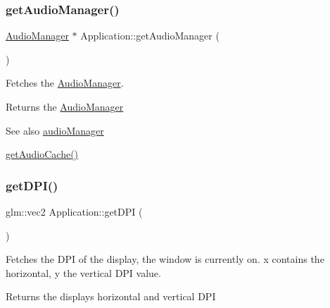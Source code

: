 \subsubsection{\texorpdfstring{getAudioManager()}{getAudioManager()}}
{\footnotesize\ttfamily \mbox{\hyperlink{classsage_1_1AudioManager}{Audio\+Manager}} $\ast$ Application\+::get\+Audio\+Manager (\begin{DoxyParamCaption}{ }\end{DoxyParamCaption})}



Fetches the \mbox{\hyperlink{classsage_1_1AudioManager}{Audio\+Manager}}. 

\begin{DoxyReturn}{Returns}
the \mbox{\hyperlink{classsage_1_1AudioManager}{Audio\+Manager}} 
\end{DoxyReturn}
\begin{DoxySeeAlso}{See also}
\mbox{\hyperlink{classsage_1_1Application_aa5d509f796f7d2d9a779fc01143c3a75}{audio\+Manager}} 

\mbox{\hyperlink{classsage_1_1Application_aaed4c540666d784b83d5506e51fb5eaa}{get\+Audio\+Cache()}} 
\end{DoxySeeAlso}
\mbox{\label{classsage_1_1Application_a452bc916f132e0997a02de53d49364d3}} 
\subsubsection{\texorpdfstring{getDPI()}{getDPI()}}
{\footnotesize\ttfamily glm\+::vec2 Application\+::get\+D\+PI (\begin{DoxyParamCaption}{ }\end{DoxyParamCaption})}



Fetches the D\+PI of the display, the window is currently on. x contains the horizontal, y the vertical D\+PI value. 

\begin{DoxyReturn}{Returns}
the displays horizontal and vertical D\+PI 
\end{DoxyReturn}
\mbox{\label{classsage_1_1Application_a37c65bddaa8e4534b28f5b36b66fdd81}} 
